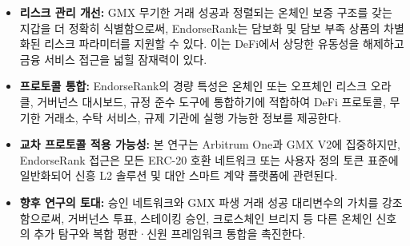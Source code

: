 \begin{itemize}
\item[\textbullet] \textbf{리스크 관리 개선:} GMX 무기한 거래 성공과 정렬되는 온체인 보증 구조를 갖는 지갑을 더 정확히 식별함으로써, EndorseRank는 담보화 및 담보 부족 상품의 차별화된 리스크 파라미터를 지원할 수 있다. 이는 DeFi에서 상당한 유동성을 해제하고 금융 서비스 접근을 넓힐 잠재력이 있다.
\item[\textbullet] \textbf{프로토콜 통합:} EndorseRank의 경량 특성은 온체인 또는 오프체인 리스크 오라클, 거버넌스 대시보드, 규정 준수 도구에 통합하기에 적합하여 DeFi 프로토콜, 무기한 거래소, 수탁 서비스, 규제 기관에 실행 가능한 정보를 제공한다.
\end{itemize}

\begin{itemize}
\item[\textbullet] \textbf{교차 프로토콜 적용 가능성:} 본 연구는 Arbitrum One과 GMX V2에 집중하지만, EndorseRank 접근은 모든 ERC-20 호환 네트워크 또는 사용자 정의 토큰 표준에 일반화되어 신흥 L2 솔루션 및 대안 스마트 계약 플랫폼에 관련된다.
\item[\textbullet] \textbf{향후 연구의 토대:} 승인 네트워크와 GMX 파생 거래 성공 대리변수의 가치를 강조함으로써, 거버넌스 투표, 스테이킹 승인, 크로스체인 브리지 등 다른 온체인 신호의 추가 탐구와 복합 평판·신원 프레임워크 통합을 촉진한다.
\end{itemize}
